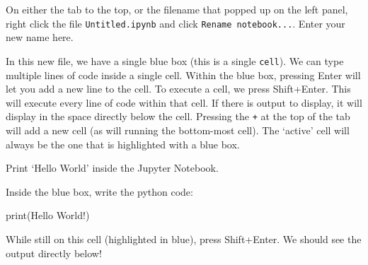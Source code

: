 \documentclass[
  letterpaper,
  DIV=11,
  numbers=noendperiod]{scrreprt}
\newenvironment{Shaded}{\begin{snugshade}}{\end{snugshade}}
\newcommand{\BuiltInTok}[1]{\textcolor[rgb]{0.00,0.23,0.31}{#1}}
\newcommand{\NormalTok}[1]{\textcolor[rgb]{0.00,0.23,0.31}{#1}}
\newcommand{\StringTok}[1]{\textcolor[rgb]{0.13,0.47,0.30}{#1}}
\begin{document}
\begin{tcolorbox}[enhanced jigsaw, rightrule=.15mm, opacitybacktitle=0.6, colback=white, toprule=.15mm, colframe=quarto-callout-note-color-frame, bottomtitle=1mm, bottomrule=.15mm, arc=.35mm, coltitle=black, breakable, title={Solution to Challenge 3}, titlerule=0mm, opacityback=0, colbacktitle=quarto-callout-note-color!10!white, left=2mm, toptitle=1mm, leftrule=.75mm]
On either the tab to the top, or the filename that popped up on the left
panel, right click the file \texttt{Untitled.ipynb} and click
\texttt{Rename\ notebook...}. Enter your new name here.
\end{tcolorbox}

In this new file, we have a single blue box (this is a single
\texttt{cell}). We can type multiple lines of code inside a single cell.
Within the blue box, pressing Enter will let you add a new line to the
cell. To execute a cell, we press Shift+Enter. This will execute every
line of code within that cell. If there is output to display, it will
display in the space directly below the cell. Pressing the \texttt{+} at
the top of the tab will add a new cell (as will running the bottom-most
cell). The `active' cell will always be the one that is highlighted with
a blue box.

\begin{tcolorbox}[enhanced jigsaw, rightrule=.15mm, opacitybacktitle=0.6, colback=white, toprule=.15mm, colframe=quarto-callout-warning-color-frame, bottomtitle=1mm, bottomrule=.15mm, arc=.35mm, coltitle=black, breakable, title={Challenge 4}, titlerule=0mm, opacityback=0, colbacktitle=quarto-callout-warning-color!10!white, left=2mm, toptitle=1mm, leftrule=.75mm]
Print `Hello World' inside the Jupyter Notebook.
\end{tcolorbox}

\begin{tcolorbox}[enhanced jigsaw, rightrule=.15mm, opacitybacktitle=0.6, colback=white, toprule=.15mm, colframe=quarto-callout-note-color-frame, bottomtitle=1mm, bottomrule=.15mm, arc=.35mm, coltitle=black, breakable, title={Solution to Challenge 4}, titlerule=0mm, opacityback=0, colbacktitle=quarto-callout-note-color!10!white, left=2mm, toptitle=1mm, leftrule=.75mm]
Inside the blue box, write the python code:

\begin{Shaded}
\begin{Highlighting}[]
\BuiltInTok{print}\NormalTok{(}\StringTok{\textquotesingle{}Hello World!\textquotesingle{}}\NormalTok{)}
\end{Highlighting}
\end{Shaded}

While still on this cell (highlighted in blue), press Shift+Enter. We
should see the output directly below!
\end{tcolorbox}
\end{document}
